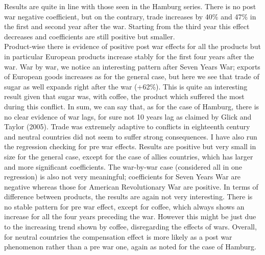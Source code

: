 \documentclass[12pt,a4paper,titlepage]{article}
\begin{document}
Results are quite in line with those seen in the Hamburg series. There is no post war negative coefficient, but on the contrary, trade increases by 40\% and 47\% in the first and second year after the war. Starting from the third year this effect decreases and coefficients are still positive but smaller. \\
Product-wise there is evidence of positive post war effects for all the products but in particular European products increase stably for the first four years after the war. War by war, we notice an interesting pattern after Seven Years War; exports of European goods increases as for the general case, but here we see that trade of sugar as well expands right after the war (+62\%). This is quite an interesting result given that sugar was, with coffee, the product which suffered the most during this conflict. 
In sum, we can say that, as for the case of Hamburg, there is no clear evidence of war lags, for sure not 10 years lag as claimed by Glick and Taylor (2005). Trade was extremely adaptive to conflicts in eighteenth century and neutral countries did not seem to suffer strong consequences.
I have also run the regression checking for pre war effects. Results are positive but very small in size for the general case, except for the case of allies countries, which has larger and more significant coefficients. The war-by-war case (considered all in one regression) is also not very meaningful; coefficients for Seven Years War are negative whereas those for American Revolutionary War are positive. In terms of difference between products, the results are again not very interesting. There is no stable pattern for pre war effect, except for coffee, which always shows an increase for all the four years preceding the war. However this might be just due to the increasing trend shown by coffee, disregarding the effects of wars.
Overall, for neutral countries the compensation effect is more likely as a post war phenomenon rather than a pre war one, again as noted for the case of Hamburg. 
\end{document}
